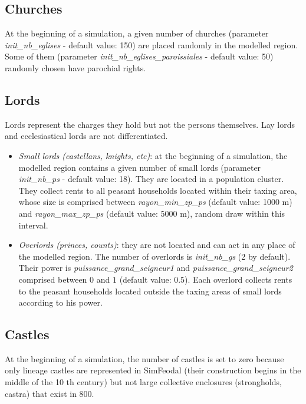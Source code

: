 \documentclass[a4paper,11pt]{article}
\begin{document}
\subsection{Churches}
\begin{sloppypar}
At the beginning of a simulation, a given number of churches (parameter \textit{init\_nb\_eglises} - default value: 150) are placed randomly in the modelled region. Some of them (parameter \textit{init\_nb\_eglises\_paroissiales} - default value: 50) randomly chosen have parochial rights.
\end{sloppypar}

\subsection{Lords}
Lords represent the charges they hold but not the persons themselves. Lay lords and ecclesiastical lords are not differentiated.
\begin{itemize}
\item \textit{Small lords (castellans, knights, etc)}: at the beginning of a simulation, the modelled region contains a given number of small lords (parameter \textit{init\_nb\_ps} - default value: 18). They are located in a population cluster. They collect rents to all peasant households located within their taxing area, whose size is comprised between \textit{rayon\_min\_zp\_ps} (default value: 1000 m) and \textit{rayon\_max\_zp\_ps} (default value: 5000 m), random draw within this interval.
\item \textit{Overlords (princes, counts)}: they are not located and can act in any place of the modelled region. The number of overlords is \textit{init\_nb\_gs} (2 by default). Their power is \textit{puissance\_grand\_seigneur1} and \textit{puissance\_grand\_seigneur2} comprised between $0$ and $1$ (default value: 0.5). Each overlord collects rents to the peasant households located outside the taxing areas of small lords according to his power.
\end{itemize}

\subsection{Castles}
At the beginning of a simulation, the number of castles is set to zero because only lineage castles are represented in SimFeodal (their construction begins in the middle of the 10 th century) but not large collective enclosures (strongholds, castra) that exist in 800.
\end{document}
